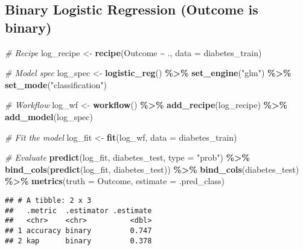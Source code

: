 \documentclass[
]{article}
\newenvironment{Shaded}{\begin{snugshade}}{\end{snugshade}}
\newcommand{\AttributeTok}[1]{\textcolor[rgb]{0.13,0.29,0.53}{#1}}
\newcommand{\CommentTok}[1]{\textcolor[rgb]{0.56,0.35,0.01}{\textit{#1}}}
\newcommand{\FunctionTok}[1]{\textcolor[rgb]{0.13,0.29,0.53}{\textbf{#1}}}
\newcommand{\NormalTok}[1]{#1}
\newcommand{\OtherTok}[1]{\textcolor[rgb]{0.56,0.35,0.01}{#1}}
\newcommand{\SpecialCharTok}[1]{\textcolor[rgb]{0.81,0.36,0.00}{\textbf{#1}}}
\newcommand{\StringTok}[1]{\textcolor[rgb]{0.31,0.60,0.02}{#1}}
\begin{document}
\subsection{Binary Logistic Regression (Outcome is
binary)}\label{binary-logistic-regression-outcome-is-binary}

\begin{Shaded}
\begin{Highlighting}[]
\CommentTok{\# Recipe}
\NormalTok{log\_recipe }\OtherTok{\textless{}{-}} \FunctionTok{recipe}\NormalTok{(Outcome }\SpecialCharTok{\textasciitilde{}}\NormalTok{ ., }\AttributeTok{data =}\NormalTok{ diabetes\_train)}

\CommentTok{\# Model spec}
\NormalTok{log\_spec }\OtherTok{\textless{}{-}} \FunctionTok{logistic\_reg}\NormalTok{() }\SpecialCharTok{\%\textgreater{}\%}
  \FunctionTok{set\_engine}\NormalTok{(}\StringTok{"glm"}\NormalTok{) }\SpecialCharTok{\%\textgreater{}\%}
  \FunctionTok{set\_mode}\NormalTok{(}\StringTok{"classification"}\NormalTok{)}

\CommentTok{\# Workflow}
\NormalTok{log\_wf }\OtherTok{\textless{}{-}} \FunctionTok{workflow}\NormalTok{() }\SpecialCharTok{\%\textgreater{}\%}
  \FunctionTok{add\_recipe}\NormalTok{(log\_recipe) }\SpecialCharTok{\%\textgreater{}\%}
  \FunctionTok{add\_model}\NormalTok{(log\_spec)}

\CommentTok{\# Fit the model}
\NormalTok{log\_fit }\OtherTok{\textless{}{-}} \FunctionTok{fit}\NormalTok{(log\_wf, }\AttributeTok{data =}\NormalTok{ diabetes\_train)}

\CommentTok{\# Evaluate}
\FunctionTok{predict}\NormalTok{(log\_fit, diabetes\_test, }\AttributeTok{type =} \StringTok{"prob"}\NormalTok{) }\SpecialCharTok{\%\textgreater{}\%}
  \FunctionTok{bind\_cols}\NormalTok{(}\FunctionTok{predict}\NormalTok{(log\_fit, diabetes\_test)) }\SpecialCharTok{\%\textgreater{}\%}
  \FunctionTok{bind\_cols}\NormalTok{(diabetes\_test) }\SpecialCharTok{\%\textgreater{}\%}
  \FunctionTok{metrics}\NormalTok{(}\AttributeTok{truth =}\NormalTok{ Outcome, }\AttributeTok{estimate =}\NormalTok{ .pred\_class)}
\end{Highlighting}
\end{Shaded}

\begin{verbatim}
## # A tibble: 2 x 3
##   .metric  .estimator .estimate
##   <chr>    <chr>          <dbl>
## 1 accuracy binary         0.747
## 2 kap      binary         0.378
\end{verbatim}
\end{document}

